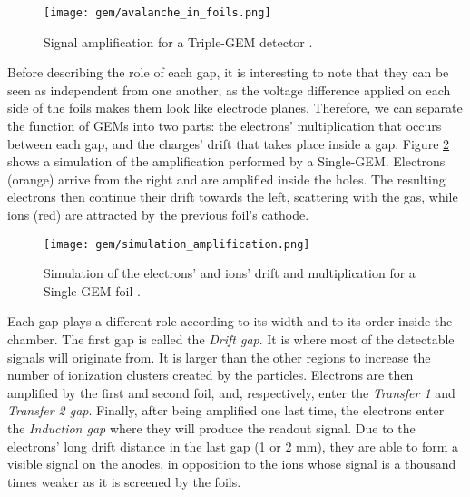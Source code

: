             \begin{figure}[h!]
                \centering
                \texttt{[image: gem/avalanche\_in\_foils.png]}
                \caption{Signal amplification for a Triple-GEM detector \Cite{Thesis_Laura}.}
                \label{fig:gas_electron_multiplier_detectors__foils}
            \end{figure}

            Before describing the role of each gap, it is interesting to note that they can be seen as independent from one another, as the voltage difference applied on each side of the foils makes them look like electrode planes. Therefore, we can separate the function of GEMs into two parts: the electrons' multiplication that occurs between each gap, and the charges' drift that takes place inside a gap. Figure \ref{fig:gas_electron_multiplier_detectors__amplification} shows a simulation of the amplification performed by a Single-GEM. Electrons (orange) arrive from the right and are amplified inside the holes. The resulting electrons then continue their drift towards the left, scattering with the gas, while ions (red) are attracted by the previous foil's cathode.

            \begin{figure}[h!]
                \centering
                \texttt{[image: gem/simulation\_amplification.png]}
                \caption{Simulation of the electrons' and ions' drift and multiplication for a Single-GEM foil \Cite{These_Geoffrey}.}
                \label{fig:gas_electron_multiplier_detectors__amplification}
            \end{figure}    

            Each gap plays a different role according to its width and to its order inside the chamber. The first gap is called the \emph{Drift gap}. It is where most of the detectable signals will originate from. It is larger than the other regions to increase the number of ionization clusters created by the particles. Electrons are then amplified by the first and second foil, and, respectively, enter the \emph{Transfer 1} and \emph{Transfer 2 gap}. Finally, after being amplified one last time, the electrons enter the \emph{Induction gap} where they will produce the readout signal. Due to the electrons' long drift distance in the last gap (1 or 2 mm), they are able to form a visible signal on the anodes, in opposition to the ions whose signal is a thousand times weaker as it is screened by the foils. \\

